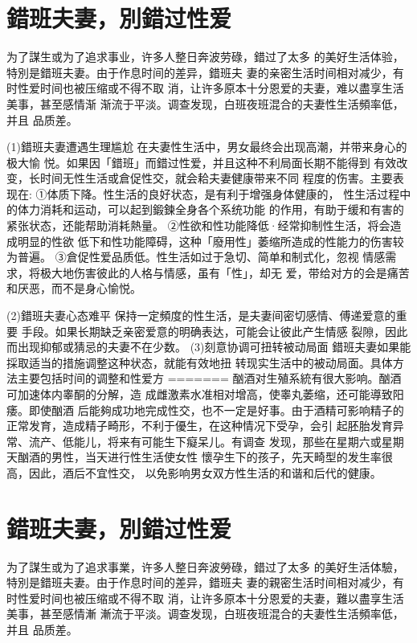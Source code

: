 \documentclass[12pt,UTF8]{ctexbook}
\begin{document}
\section{錯班夫妻，別錯过性爱}

为了謀生或为了追求事业，许多人整日奔波劳碌，錯过了太多
的美好生活体验，特別是錯班夫妻。由于作息时间的差异，錯班夫
妻的亲密生活时间相对减少，有时性爱时间也被压缩或不得不取
消，让许多原本十分恩爱的夫妻，难以盡享生活美事，甚至感情渐
渐流于平淡。调查发现，白班夜班混合的夫妻性生活頻率低，并且
品质差。

(1)錯班夫妻遭遇生理尴尬
在夫妻性生活中，男女最终会出现高潮，并带来身心的极大愉
悦。如果因「錯班」而錯过性爱，并且这种不利局面长期不能得到
有效改变，长时间无性生活或倉促性交，就会耠夫妻健康带来不同
程度的伤害。主要表现在:
①体质下降。性生活的良好状态，是有利于增强身体健康的，
性生活过程中的体力消耗和运动，可以起到鍛鍊全身各个系统功能
的作用，有助于缓和有害的紧张状态，还能帮助消耗熱量。
②性欲和性功能降低·经常抑制性生活，将会造成明显的性欲
低下和性功能障碍，这种「廢用性」萎缩所造成的性能力的伤害较
为普遍。
③倉促性爱品质低。性生活如过于急切、简单和制式化，忽视
情感需求，将极大地伤害彼此的人格与情感，虽有「性」，却无
爱，带给对方的会是痛苦和厌恶，而不是身心愉悦。

(2)錯班夫妻心态难平
保持一定頻度的性生活，是夫妻间密切感情、傅递爱意的重要
手段。如果长期缺乏亲密爱意的明确表达，可能会让彼此产生情感
裂隙，因此而出现抑郁或猜忌的夫妻不在少数。
(3)刻意协调可扭转被动局面
錯班夫妻如果能採取适当的措施调整这种状态，就能有效地扭
转现实生活中的被动局面。具体方法主要包括时间的调整和性爱方
=======
酗酒对生殖系統有很大影响。酗酒可加速体内睾酮的分解，造
成雌激素水准相对增高，使睾丸萎缩，还可能導致阳痿。即使酗酒
后能夠成功地完成性交，也不一定是好事。由于酒精可影响精子的
正常发育，造成精子畸形，不利于優生，在这种情况下受孕，会引
起胚胎发育异常、流产、低能儿，将来有可能生下癡呆儿。有调查
发现，那些在星期六或星期天酗酒的男性，当天进行性生活使女性
懷孕生下的孩子，先天畸型的发生率很高，因此，酒后不宜性交，
以免影响男女双方性生活的和谐和后代的健康。

\section{錯班夫妻，別錯过性爱}

为了謀生或为了追求事業，许多人整日奔波勞碌，錯过了太多
的美好生活体驗，特別是錯班夫妻。由于作息时间的差异，錯班夫
妻的親密生活时间相对减少，有时性爱时间也被压缩或不得不取
消，让许多原本十分恩爱的夫妻，難以盡享生活美事，甚至感情漸
漸流于平淡。调查发现，白班夜班混合的夫妻性生活頻率低，并且
品质差。
\end{document}
